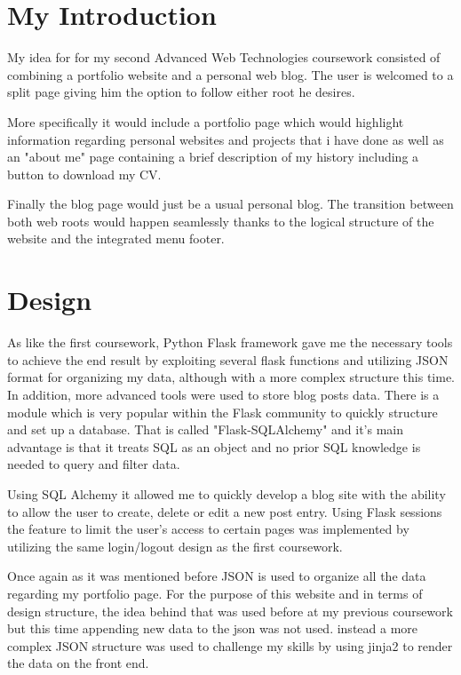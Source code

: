 \documentclass[10pt, a4paper]{article}
\title{\mytitle}
\author{\myauthor\hspace{1em}\\\contact\\Edinburgh Napier University\hspace{0.5em}-\hspace{0.5em}\mymodule}
\date{}
\begin{document}
	\maketitle

    

	\section{ My Introduction}
	
	My idea for for my second Advanced Web Technologies coursework consisted of combining a portfolio website and a personal web blog.
	The user is welcomed to a split page giving him the option to follow either root he desires.
	
    More specifically it would include a portfolio page which would highlight information regarding personal websites and projects that i have done as well as an "about me" page containing a brief description of my history including a button to download my CV. 
    
    Finally the blog page would just be a usual personal blog. The transition between both web roots would happen seamlessly thanks to the logical structure of the website and the integrated menu footer.
	


	\section{Design}
	
    As like the first coursework, Python Flask framework gave me the necessary tools to achieve the end result by exploiting several flask functions and utilizing JSON format for organizing my data, although with a more complex structure this time. In addition, more advanced tools were used to store blog posts data. There is a module which is very popular within the Flask community to quickly structure and set up a database. That is called "Flask-SQLAlchemy" and it's main advantage is that it treats SQL as an object and no prior SQL knowledge is needed to query and filter data. 
    
    Using SQL Alchemy it allowed me to quickly develop a blog site with the ability to allow the user to create, delete or edit a new post entry. Using Flask sessions the feature to limit the user's access to certain pages was implemented by utilizing the same login/logout design as the first coursework. 
    
    Once again as it was mentioned before JSON is used to organize all the data regarding my portfolio page. For the purpose of this website and in terms of design structure, the idea behind that was used before at my previous coursework but this time appending  new data to the json was not used. instead a more complex JSON structure was used to challenge my skills by using jinja2 to render the data on the front end.
	
\end{document}
